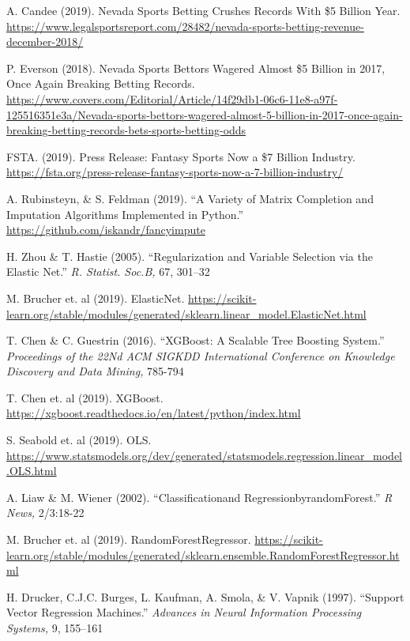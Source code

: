 \documentclass[12pt]{article}
\begin{document}
\pagebreak
\begin{thebibliography}{}

A. Candee (2019). Nevada Sports Betting Crushes Records With \$5 Billion Year. \url{https://www.legalsportsreport.com/28482/nevada-sports-betting-revenue-december-2018/}

P. Everson (2018). Nevada Sports Bettors Wagered Almost \$5 Billion in 2017, Once Again Breaking Betting Records. \url{https://www.covers.com/Editorial/Article/14f29db1-06c6-11e8-a97f-125516351e3a/Nevada-sports-bettors-wagered-almost-5-billion-in-2017-once-again-breaking-betting-records-bets-sports-betting-odds}

FSTA. (2019). Press Release: Fantasy Sports Now a \$7 Billion Industry. \url{https://fsta.org/press-release-fantasy-sports-now-a-7-billion-industry/}

A. Rubinsteyn, \& S. Feldman (2019). 
``A Variety of Matrix Completion and Imputation Algorithms Implemented in Python.'' 
\url{https://github.com/iskandr/fancyimpute}

H. Zhou \& T. Hastie (2005). 
``Regularization and Variable Selection via the Elastic Net.'' 
\textit{R. Statist. Soc.B,} 67, 301–32

M. Brucher et. al (2019). 
ElasticNet. \url{https://scikit-learn.org/stable/modules/generated/sklearn.linear_model.ElasticNet.html}

T. Chen \& C. Guestrin (2016). 
``XGBoost: A Scalable Tree Boosting System.'' 
\textit{Proceedings of the 22Nd ACM SIGKDD International Conference on Knowledge Discovery and Data Mining,} 785-794

T. Chen et. al (2019). 
XGBoost. \url{https://xgboost.readthedocs.io/en/latest/python/index.html}

S. Seabold et. al (2019). 
OLS. \url{https://www.statsmodels.org/dev/generated/statsmodels.regression.linear_model.OLS.html}

A. Liaw \& M. Wiener (2002). 
``Classificationand RegressionbyrandomForest.'' 
\textit{R News,} 2/3:18-22

M. Brucher et. al (2019). 
RandomForestRegressor. \url{https://scikit-learn.org/stable/modules/generated/sklearn.ensemble.RandomForestRegressor.html}

H. Drucker, C.J.C. Burges, L. Kaufman, A. Smola, \& V. Vapnik (1997).
``Support Vector Regression Machines.'' 
\textit{Advances in Neural Information Processing Systems,} 9, 155–161


\end{thebibliography}
\end{document}
